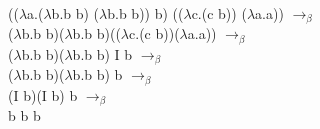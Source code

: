 \documentclass[12pt]{article}
\begin{document}
    (($\lambda$a.($\lambda$b.b b) ($\lambda$b.b b)) b) (($\lambda$c.(c b)) ($\lambda$a.a)) $\rightarrow_{\beta}$\\
    ($\lambda$b.b b)($\lambda$b.b b)(($\lambda$c.(c b))($\lambda$a.a)) $\rightarrow_{\beta}$\\
    ($\lambda$b.b b)($\lambda$b.b b) I b $\rightarrow_{\beta}$\\
    ($\lambda$b.b b)($\lambda$b.b b) b $\rightarrow_{\beta}$\\
    (I b)(I b) b  $\rightarrow_{\beta}$\\
    b b b
\end{document}
